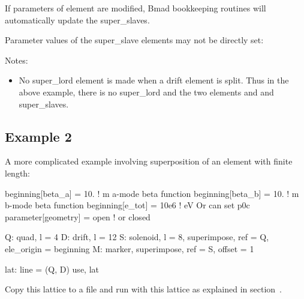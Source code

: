 \documentclass{hitec}
\begin{document}
If parameters of element  are modified, Bmad bookkeeping routines will automatically update the super_slaves.

Parameter values of the super_slave elements may not be directly set:

Notes:
\begin{itemize}
\item No super_lord element is made when a drift element is split. Thus in the above example, there is no  super_lord and
the two elements  and  and  super_slaves.
\end{itemize}

\subsection{Example 2}


A more complicated example involving superposition of an element with finite length:
\begin{code}
beginning[beta_a] = 10.   ! m  a-mode beta function
beginning[beta_b] = 10.   ! m  b-mode beta function
beginning[e_tot] = 10e6   ! eV   Or can set p0c
parameter[geometry] = open      ! or closed

Q: quad, l = 4
D: drift, l = 12
S: solenoid, l = 8, superimpose, ref = Q, ele_origin = beginning
M: marker, superimpose, ref = S, offset = 1

lat: line = (Q, D)
use, lat
\end{code}

Copy this lattice to a file and run \tao with this lattice as explained in
section~. 
\end{document}
